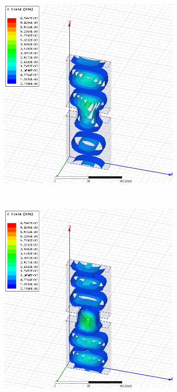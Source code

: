 \documentclass[12pt,a4paper]{article}
\begin{document}
\begin{figure}
\begin{subfigure}[b]{0.49\textwidth}
    \includegraphics[width=\textwidth]{./mid_sec_20mm_wide_10mm_long/7ghz.png}
    \label{fig:2_2010_7ghz}
  \end{subfigure}\\
  \begin{subfigure}[b]{0.49\textwidth}
    \includegraphics[width=\textwidth]{./mid_sec_20mm_wide_10mm_long/9ghz.png}

\end{subfigure}
\end{figure}
\end{document}
